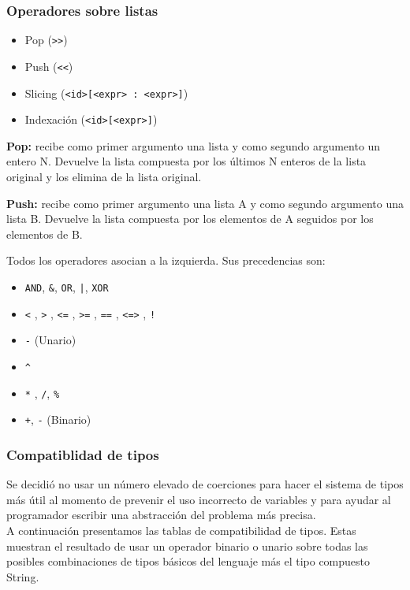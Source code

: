 \documentclass[12pt, spanish]{report}
\begin{document}
\subsubsection{Operadores sobre listas}
\begin{itemize}
\item Pop          (\texttt{\textgreater \textgreater})
\item Push         (\texttt{\textless \textless})
\item Slicing      (\texttt{<id>[<expr> : <expr>]})
\item Indexaci\'on (\texttt{<id>[<expr>]})
\end{itemize}

\textbf{Pop:} recibe como primer argumento una lista y como segundo
argumento un entero N. Devuelve la lista compuesta por los \'ultimos N
enteros de la lista original y los elimina de la lista original.

\textbf{Push:} recibe como primer argumento una lista A y como segundo
argumento una lista B. Devuelve la lista compuesta por los elementos de
A seguidos por los elementos de B.

Todos los operadores asocian a la izquierda. Sus precedencias son:
\begin{itemize}
\item \texttt{AND}, \texttt{\&}, \texttt{OR}, \texttt{|}, \texttt{XOR}
\item \texttt{<} , \texttt{>} , \texttt{<=} , \texttt{>=} , \texttt{==} , \texttt{<=>} , \texttt{!}
\item \texttt{-} (Unario)
\item \texttt{\^}
\item \texttt{*} ,  \texttt{/}, \texttt{\%}
\item \texttt{+}, \texttt{-} (Binario)
\end{itemize}

\subsubsection{Compatiblidad de tipos}
\label{subsec:comp-tipos}
Se decidi\'o no usar un n\'umero elevado de coerciones para hacer el
sistema de tipos m\'as \'util al momento de prevenir el uso incorrecto
de variables y para ayudar al programador escribir una abstracci\'on del
problema m\'as precisa.\\

\indent A continuaci\'on presentamos las tablas de compatibilidad de
tipos. Estas muestran el resultado de usar un operador binario o unario sobre
todas las posibles combinaciones de tipos b\'asicos del lenguaje m\'as
el tipo compuesto String.\\
\end{document}
